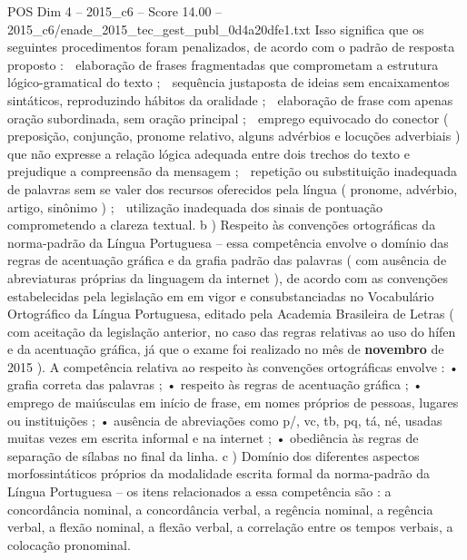 \begin{textsample}{POS Dim 4 – 2015\_c6 – Score 14.00 – 2015\_c6/enade\_2015\_tec\_gest\_publ\_0d4a20dfe1.txt}
Isso significa que os seguintes procedimentos foram penalizados, de acordo com o padrão de resposta proposto :  elaboração de frases fragmentadas que comprometam a estrutura lógico-gramatical do texto ;  sequência justaposta de ideias sem encaixamentos sintáticos, reproduzindo hábitos da oralidade ;  elaboração de frase com apenas oração subordinada, sem oração principal ;  emprego equivocado do conector ( preposição, conjunção, pronome relativo, alguns advérbios e locuções adverbiais ) que não expresse a relação lógica adequada entre dois trechos do texto e prejudique a compreensão da mensagem ;  repetição ou substituição inadequada de palavras sem se valer dos recursos oferecidos pela língua ( pronome, advérbio, artigo, sinônimo ) ;  utilização inadequada dos sinais de pontuação comprometendo a clareza textual. b ) Respeito às convenções ortográficas da norma-padrão da Língua Portuguesa – essa competência envolve o domínio das regras de acentuação gráfica e da grafia padrão das palavras ( com ausência de abreviaturas próprias da linguagem da internet ), de acordo com as convenções estabelecidas pela legislação em em vigor e consubstanciadas no Vocabulário Ortográfico da Língua Portuguesa, editado pela Academia Brasileira de Letras ( com aceitação da legislação anterior, no caso das regras relativas ao uso do hífen e da acentuação gráfica, já que o exame foi realizado no mês de \textbf{novembro} de 2015 ).
A competência relativa ao respeito às convenções ortográficas envolve : • grafia correta das palavras ; • respeito às regras de acentuação gráfica ; • emprego de maiúsculas em início de frase, em nomes próprios de pessoas, lugares ou instituições ; • ausência de abreviações como p/, vc, tb, pq, tá, né, usadas muitas vezes em escrita informal e na internet ; • obediência às regras de separação de sílabas no final da linha. c ) Domínio dos diferentes aspectos morfossintáticos próprios da modalidade escrita formal da norma-padrão da Língua Portuguesa – os itens relacionados a essa competência são : a concordância nominal, a concordância verbal, a regência nominal, a regência verbal, a flexão nominal, a flexão verbal, a correlação entre os tempos verbais, a colocação pronominal.

\end{textsample}
